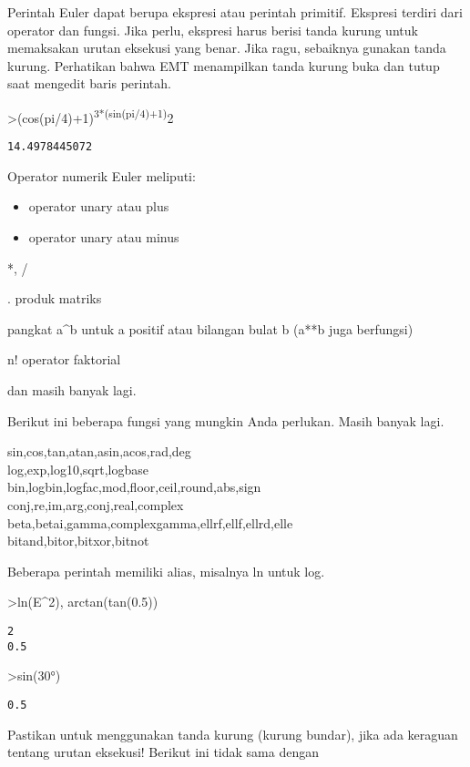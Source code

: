 \documentclass[
]{book}
\begin{document}
Perintah Euler dapat berupa ekspresi atau perintah primitif. Ekspresi terdiri dari operator dan fungsi. Jika perlu, ekspresi harus berisi tanda kurung untuk memaksakan urutan eksekusi yang benar. Jika ragu, sebaiknya gunakan tanda kurung. Perhatikan bahwa EMT menampilkan tanda kurung buka dan tutup saat mengedit baris perintah.

\textgreater(cos(pi/4)+1)\textsuperscript{3*(sin(pi/4)+1)}2

\begin{verbatim}
14.4978445072
\end{verbatim}

Operator numerik Euler meliputi:

\begin{itemize}
\item
  operator unary atau plus
\item
  operator unary atau minus
\end{itemize}

*, /

. produk matriks

pangkat a\^{}b untuk a positif atau bilangan bulat b (a**b juga berfungsi)

n! operator faktorial

dan masih banyak lagi.

Berikut ini beberapa fungsi yang mungkin Anda perlukan. Masih banyak lagi.

sin,cos,tan,atan,asin,acos,rad,deg\\
log,exp,log10,sqrt,logbase\\
bin,logbin,logfac,mod,floor,ceil,round,abs,sign\\
conj,re,im,arg,conj,real,complex\\
beta,betai,gamma,complexgamma,ellrf,ellf,ellrd,elle\\
bitand,bitor,bitxor,bitnot

Beberapa perintah memiliki alias, misalnya ln untuk log.

\textgreater ln(E\^{}2), arctan(tan(0.5))

\begin{verbatim}
2
0.5
\end{verbatim}

\textgreater sin(30°)

\begin{verbatim}
0.5
\end{verbatim}

Pastikan untuk menggunakan tanda kurung (kurung bundar), jika ada keraguan tentang urutan eksekusi! Berikut ini tidak sama dengan
\end{document}
